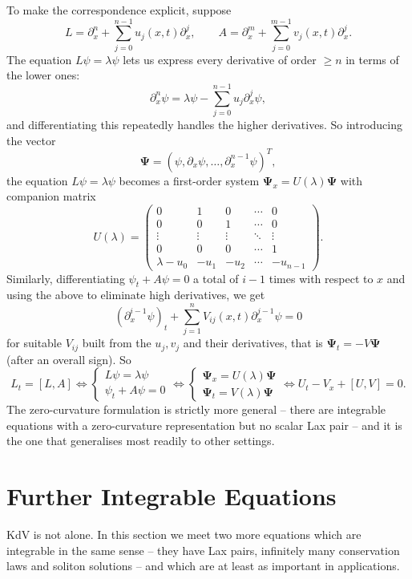 \documentclass[a4paper]{scrartcl}
\begin{document}
To make the correspondence explicit, suppose
$$
L = \partial_x^n + \sum_{j=0}^{n-1}u_j(x,t)\partial_x^j, \qquad A = \partial_x^m + \sum_{j=0}^{m-1}v_j(x,t)\partial_x^j.
$$
The equation $L\psi = \lambda\psi$ lets us express every derivative of order $\ge n$ in terms of the lower ones:
$$
\partial_x^n\psi = \lambda\psi - \sum_{j=0}^{n-1}u_j\partial_x^j\psi,
$$
and differentiating this repeatedly handles the higher derivatives. So introducing the vector
$$
\bm\Psi = \left(\psi, \partial_x\psi, \dots, \partial_x^{n-1}\psi\right)^T,
$$
the equation $L\psi = \lambda\psi$ becomes a first-order system $\bm\Psi_x = U(\lambda)\bm\Psi$ with companion matrix
$$
U(\lambda) = \begin{pmatrix}
	0 & 1 & 0 & \cdots & 0\\
	0 & 0 & 1 & \cdots & 0\\
	\vdots & \vdots & \vdots & \ddots & \vdots\\
	0 & 0 & 0 & \cdots & 1\\
	\lambda - u_0 & -u_1 & -u_2 & \cdots & -u_{n-1}
\end{pmatrix}.
$$
Similarly, differentiating $\psi_t + A\psi = 0$ a total of $i-1$ times with respect to $x$ and using the above to eliminate high derivatives, we get
$$
\left(\partial_x^{i-1}\psi\right)_t + \sum_{j=1}^nV_{ij}(x,t)\partial_x^{j-1}\psi = 0
$$
for suitable $V_{ij}$ built from the $u_j, v_j$ and their derivatives, that is $\bm\Psi_t = -V\bm\Psi$ (after an overall sign). So
$$
L_t = [L,A]
\iff
\begin{cases}L\psi = \lambda\psi\\ \psi_t + A\psi = 0\end{cases}
\iff
\begin{cases}\bm\Psi_x = U(\lambda)\bm\Psi\\ \bm\Psi_t = V(\lambda)\bm\Psi\end{cases}
\iff
U_t - V_x + [U,V] = 0.
$$
The zero-curvature formulation is strictly more general -- there are integrable equations with a zero-curvature representation but no scalar Lax pair -- and it is the one that generalises most readily to other settings.

\section{Further Integrable Equations}

KdV is not alone. In this section we meet two more equations which are integrable in the same sense -- they have Lax pairs, infinitely many conservation laws and soliton solutions -- and which are at least as important in applications.
\end{document}
